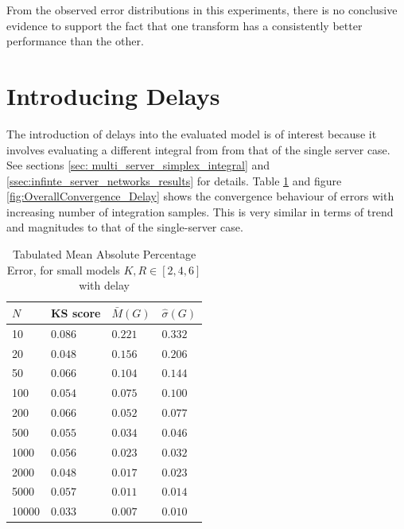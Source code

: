 From the observed error distributions in this experiments, there is no conclusive evidence to support the fact that one transform has a consistently better performance than the other. 

\section{Introducing Delays}\label{sec:Analyze_Delays}

The introduction of delays into the evaluated model is of interest because it involves evaluating a different integral from from that of the single server case. See sections \ref{sec: multi_server_simplex_integral} and \ref{ssec:infinte_server_networks_results} for details. Table \ref{tab:convergence_tabulated_errors_SM_delay} and figure \ref{fig:OverallConvergence_Delay} shows the convergence behaviour of errors with increasing number of integration samples. This is very similar in terms of trend and magnitudes to that of the single-server case.\\

\begin{table}[!htb] 
\begin{center}
\begin{tabular}{@{}llll@{}}
\toprule
    \(N\) & KS score & \(\bar{M}(G)\)  & \(\hat{\sigma}(G)\) \\  \midrule
    10 &\(0.086\) & \(0.221\) & \(0.332\)  \\ 
    20 &\(0.048\) & \(0.156\) & \(0.206\)  \\ 
    50 &\(0.066\) & \(0.104\) & \(0.144\)  \\ 
    100 &\(0.054\) & \(0.075\) & \(0.100\)  \\ 
    200 &\(0.066\) & \(0.052\) & \(0.077\)  \\ 
    500 &\(0.055\) & \(0.034\) & \(0.046\)  \\ 
    1000 &\(0.056\) & \(0.023\) & \(0.032\)  \\ 
    2000 &\(0.048\) & \(0.017\) & \(0.023\)  \\ 
    5000 &\(0.057\) & \(0.011\) & \(0.014\)  \\ 
    10000 &\(0.033\) & \(0.007\) & \(0.010\)  \\      \bottomrule
\end{tabular}
\end{center}
\caption{Tabulated Mean Absolute Percentage Error, for small models \(K,R \in [2,4,6]\) with delay}
\label{tab:convergence_tabulated_errors_SM_delay}
\end{table} 

